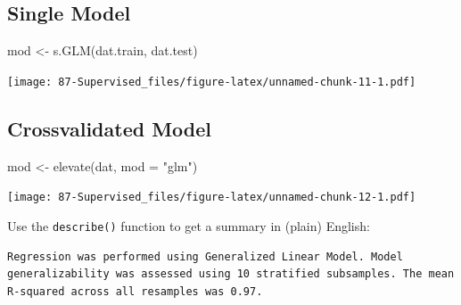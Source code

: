 \documentclass[
]{book}
\newenvironment{Shaded}{\begin{snugshade}}{\end{snugshade}}
\newcommand{\AttributeTok}[1]{\textcolor[rgb]{0.77,0.63,0.00}{#1}}
\newcommand{\FunctionTok}[1]{\textcolor[rgb]{0.00,0.00,0.00}{#1}}
\newcommand{\NormalTok}[1]{#1}
\newcommand{\OtherTok}[1]{\textcolor[rgb]{0.56,0.35,0.01}{#1}}
\newcommand{\SpecialCharTok}[1]{\textcolor[rgb]{0.00,0.00,0.00}{#1}}
\newcommand{\StringTok}[1]{\textcolor[rgb]{0.31,0.60,0.02}{#1}}
\begin{document}
\hypertarget{single-model}{%
\subsection{Single Model}\label{single-model}}

\begin{Shaded}
\begin{Highlighting}[]
\NormalTok{mod }\OtherTok{\textless{}{-}} \FunctionTok{s.GLM}\NormalTok{(dat.train, dat.test)}
\end{Highlighting}
\end{Shaded}

\texttt{[image: 87-Supervised\_files/figure-latex/unnamed-chunk-11-1.pdf]}

\hypertarget{crossvalidated-model}{%
\subsection{Crossvalidated Model}\label{crossvalidated-model}}

\begin{Shaded}
\begin{Highlighting}[]
\NormalTok{mod }\OtherTok{\textless{}{-}} \FunctionTok{elevate}\NormalTok{(dat, }\AttributeTok{mod =} \StringTok{"glm"}\NormalTok{)}
\end{Highlighting}
\end{Shaded}

\texttt{[image: 87-Supervised\_files/figure-latex/unnamed-chunk-12-1.pdf]}

Use the \texttt{describe()} function to get a summary in (plain) English:

\begin{Shaded}
\end{Shaded}

\begin{verbatim}
Regression was performed using Generalized Linear Model. Model generalizability was assessed using 10 stratified subsamples. The mean R-squared across all resamples was 0.97.
\end{verbatim}

\begin{Shaded}
\end{Shaded}
\end{document}
